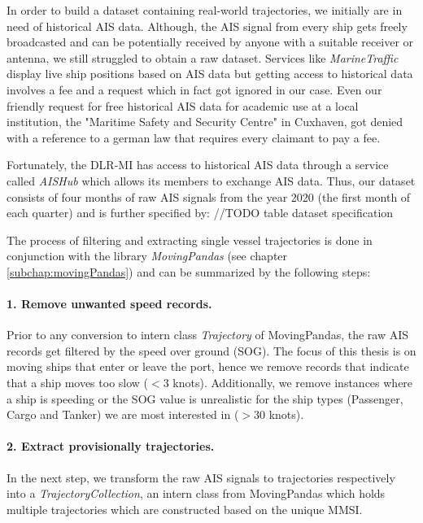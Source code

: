 In order to build a dataset containing real-world trajectories, we initially are in need of historical AIS data. Although, the AIS signal from every ship gets freely broadcasted and can be potentially received by anyone with a suitable receiver or antenna, we still struggled to obtain a raw dataset. Services like \textit{MarineTraffic} display live ship positions based on AIS data but getting access to historical data involves a fee and a request which in fact got ignored in our case. Even our friendly request for free historical AIS data for academic use at a local institution, the "Maritime Safety and Security Centre" in Cuxhaven, got denied with a reference to a german law that requires every claimant to pay a fee.
\par
Fortunately, the DLR-MI has access to historical AIS data through a service called \textit{AISHub} which allows its members to exchange AIS data. Thus, our dataset consists of four months of raw AIS signals from the year 2020 (the first month of each quarter) and is further specified by:
//TODO table dataset specification
 
\par
The process of filtering and extracting single vessel trajectories is done  in  conjunction  with  the  library \textit{MovingPandas} (see chapter \ref{subchap:movingPandas}) and can be summarized by the following steps:
\paragraph{1. Remove unwanted speed records.}
Prior to any conversion to intern class \textit{Trajectory} of MovingPandas, the raw AIS records get filtered by the speed over ground (SOG). The focus of this thesis is on moving ships that enter or leave the port, hence we remove records that indicate that a ship moves too slow ($<3$ knots). Additionally, we remove instances where a ship is speeding or the SOG value is unrealistic for the ship types (Passenger, Cargo and Tanker) we are most interested in ($>30$ knots).

\paragraph{2. Extract provisionally trajectories.}
In the next step, we transform the raw AIS signals to trajectories respectively into a \textit{TrajectoryCollection}, an intern class from MovingPandas which holds multiple trajectories which are constructed based on the unique MMSI. 

